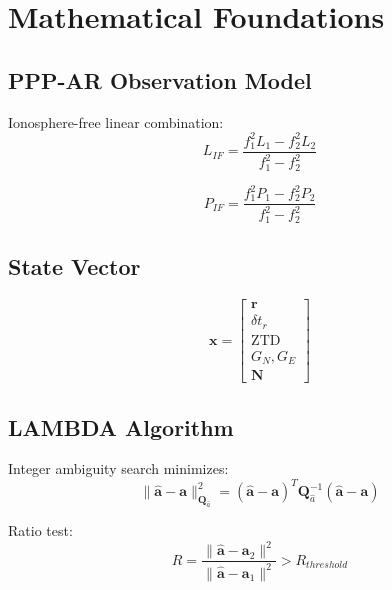 \documentclass[11pt,a4paper,twoside]{report}
\newcommand{\vecbold}[1]{\boldsymbol{#1}}
\newcommand{\mat}[1]{\mathbf{#1}}
\newcommand{\ztd}{\mathrm{ZTD}}
\begin{document}
\chapter{Mathematical Foundations}

\section{PPP-AR Observation Model}

Ionosphere-free linear combination:
\begin{equation}
L_{IF} = \frac{f_1^2 L_1 - f_2^2 L_2}{f_1^2 - f_2^2}
\end{equation}

\begin{equation}
P_{IF} = \frac{f_1^2 P_1 - f_2^2 P_2}{f_1^2 - f_2^2}
\end{equation}

\section{State Vector}

\begin{equation}
\vecbold{x} = \begin{bmatrix}
\vecbold{r} \\
\delta t_r \\
\ztd \\
G_N, G_E \\
\vecbold{N}
\end{bmatrix}
\end{equation}

\section{LAMBDA Algorithm}

Integer ambiguity search minimizes:
\begin{equation}
\|\hat{\vecbold{a}} - \vecbold{a}\|_{\mat{Q}_{\hat{a}}}^2 = (\hat{\vecbold{a}} - \vecbold{a})^T \mat{Q}_{\hat{a}}^{-1} (\hat{\vecbold{a}} - \vecbold{a})
\end{equation}

Ratio test:
\begin{equation}
R = \frac{\|\hat{\vecbold{a}} - \vecbold{a}_2\|^2}{\|\hat{\vecbold{a}} - \vecbold{a}_1\|^2} > R_{threshold}
\end{equation}
\end{document}
